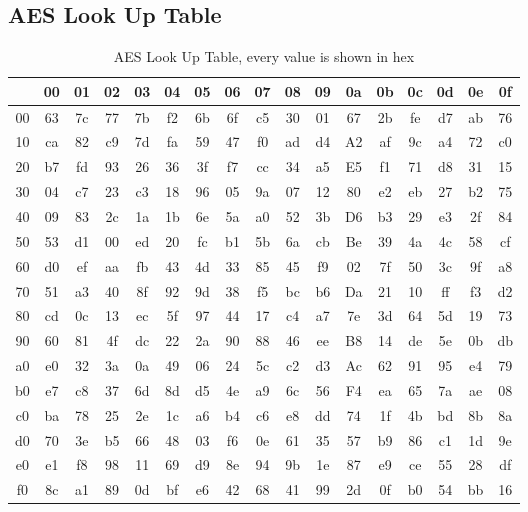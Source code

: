 \documentclass[a4paper]{article}
\begin{document}
\begin{appendix}
\section{AES Look Up Table}
\label{AESLUT}
\begin{table}[!htb]
\centering
\captionsetup{width=.8\linewidth}
\begin{tabular}{c || c c c c c c c c c c c c c c c c}
\hline
   & 00 & 01 & 02 & 03 & 04 & 05 & 06 & 07 & 08 & 09 & 0a & 0b & 0c  & 0d & 0e & 0f\\
\hline
00 & 63 & 7c & 77 & 7b & f2 & 6b & 6f & c5 & 30 & 01 & 67 & 2b & fe  & d7 & ab & 76\\
10 & ca & 82 & c9 & 7d & fa & 59 & 47 & f0 & ad & d4 & A2 & af & 9c  & a4 & 72 & c0\\
20 & b7 & fd & 93 & 26 & 36 & 3f & f7 & cc & 34 & a5 & E5 & f1 & 71  & d8 & 31 & 15\\
30 & 04 & c7 & 23 & c3 & 18 & 96 & 05 & 9a & 07 & 12 & 80 & e2 & eb  & 27 & b2 & 75\\
40 & 09 & 83 & 2c & 1a & 1b & 6e & 5a & a0 & 52 & 3b & D6 & b3 & 29  & e3 & 2f & 84\\
50 & 53 & d1 & 00 & ed & 20 & fc & b1 & 5b & 6a & cb & Be & 39 & 4a  & 4c & 58 & cf\\
60 & d0 & ef & aa & fb & 43 & 4d & 33 & 85 & 45 & f9 & 02 & 7f & 50  & 3c & 9f & a8\\
70 & 51 & a3 & 40 & 8f & 92 & 9d & 38 & f5 & bc & b6 & Da & 21 & 10  & ff & f3 & d2\\
80 & cd & 0c & 13 & ec & 5f & 97 & 44 & 17 & c4 & a7 & 7e & 3d & 64  & 5d & 19 & 73\\
90 & 60 & 81 & 4f & dc & 22 & 2a & 90 & 88 & 46 & ee & B8 & 14 & de  & 5e & 0b & db\\
a0 & e0 & 32 & 3a & 0a & 49 & 06 & 24 & 5c & c2 & d3 & Ac & 62 & 91  & 95 & e4 & 79\\
b0 & e7 & c8 & 37 & 6d & 8d & d5 & 4e & a9 & 6c & 56 & F4 & ea & 65  & 7a & ae & 08\\
c0 & ba & 78 & 25 & 2e & 1c & a6 & b4 & c6 & e8 & dd & 74 & 1f & 4b  & bd & 8b & 8a\\
d0 & 70 & 3e & b5 & 66 & 48 & 03 & f6 & 0e & 61 & 35 & 57 & b9 & 86  & c1 & 1d & 9e\\
e0 & e1 & f8 & 98 & 11 & 69 & d9 & 8e & 94 & 9b & 1e & 87 & e9 & ce  & 55 & 28 & df\\
f0 & 8c & a1 & 89 & 0d & bf & e6 & 42 & 68 & 41 & 99 & 2d & 0f & b0  & 54 & bb & 16
\end{tabular}
\caption[AES]%
{AES Look Up Table, every value is shown in hex}
\label{tab:AESTable}
\end{table}
\end{appendix}
\end{document}
